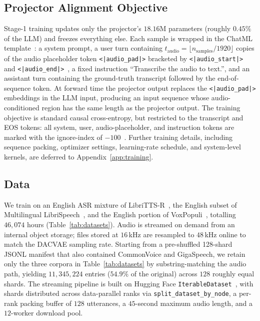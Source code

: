 \subsection{Projector Alignment Objective}
\label{sec:method:objective}

Stage-1 training updates only the projector's $18.16$M parameters (roughly $0.45\%$ of the LLM) and freezes everything else.
Each sample is wrapped in the ChatML template~\cite{OAI23}: a system prompt, a user turn containing $t_{\text{audio}} = \lfloor n_{\text{samples}} / 1920 \rfloor$ copies of the audio placeholder token \texttt{<|audio\_pad|>} bracketed by \texttt{<|audio\_start|>} and \texttt{<|audio\_end|>}~\cite{QA24}, a fixed instruction ``Transcribe the audio to text.'', and an assistant turn containing the ground-truth transcript followed by the end-of-sequence token.
At forward time the projector output replaces the \texttt{<|audio\_pad|>} embeddings in the LLM input, producing an input sequence whose audio-conditioned region has the same length as the projector output.
The training objective is standard causal cross-entropy, but restricted to the transcript and EOS tokens: all system, user, audio-placeholder, and instruction tokens are marked with the ignore-index of $-100$~\cite{HF23}.
Further training details, including sequence packing, optimizer settings, learning-rate schedule, and system-level kernels, are deferred to Appendix~\ref{app:training}.

\subsection{Data}
\label{sec:method:data}

We train on an English ASR mixture of LibriTTS-R~\cite{Ko23}, the English subset of Multilingual LibriSpeech~\cite{Pr20}, and the English portion of VoxPopuli~\cite{Wa21}, totalling $46{,}074$ hours (Table~\ref{tab:datasets}).
Audio is streamed on demand from an internal object storage; files stored at $16$\,kHz are resampled to $48$\,kHz online to match the DACVAE sampling rate.
Starting from a pre-shuffled 128-shard JSONL manifest that also contained CommonVoice and GigaSpeech, we retain only the three corpora in Table~\ref{tab:datasets} by substring-matching the audio path, yielding $11{,}345{,}224$ entries ($54.9\%$ of the original) across $128$ roughly equal shards.
The streaming pipeline is built on Hugging Face \texttt{IterableDataset}~\cite{HF23}, with shards distributed across data-parallel ranks via \texttt{split\_dataset\_by\_node}, a per-rank packing buffer of $128$ utterances, a $45$-second maximum audio length, and a $12$-worker download pool.

